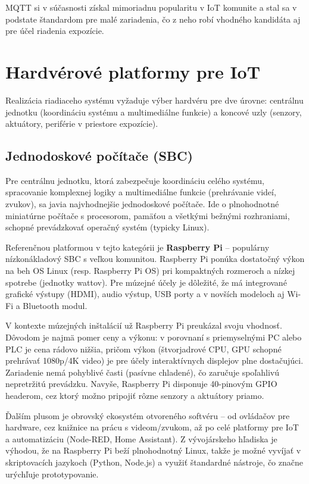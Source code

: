 MQTT si v súčasnosti získal mimoriadnu popularitu v IoT komunite a stal sa v podstate štandardom pre malé zariadenia, čo z neho robí vhodného kandidáta aj pre účel riadenia expozície.

\section{Hardvérové platformy pre IoT}
\label{hardverove-platformy}

Realizácia riadiaceho systému vyžaduje výber hardvéru pre dve úrovne: centrálnu jednotku (koordináciu systému a multimediálne funkcie) a koncové uzly (senzory, aktuátory, periférie v priestore expozície).

\subsection{Jednodoskové počítače (SBC)}
\label{sbc-platformy}

Pre centrálnu jednotku, ktorá zabezpečuje koordináciu celého systému, spracovanie komplexnej logiky a multimediálne funkcie (prehrávanie videí, zvukov), sa javia najvhodnejšie jednodoskové počítače. Ide o plnohodnotné miniatúrne počítače s procesorom, pamäťou a všetkými bežnými rozhraniami, schopné prevádzkovať operačný systém (typicky Linux).

Referenčnou platformou v tejto kategórii je \textbf{Raspberry Pi} -- populárny nízkonákladový SBC s veľkou komunitou. Raspberry Pi ponúka dostatočný výkon na beh OS Linux (resp. Raspberry Pi OS) pri kompaktných rozmeroch a nízkej spotrebe (jednotky wattov). Pre múzejné účely je dôležité, že má integrované grafické výstupy (HDMI), audio výstup, USB porty a v novších modeloch aj Wi-Fi a Bluetooth modul.

V kontexte múzejných inštalácií už Raspberry Pi preukázal svoju vhodnosť. Dôvodom je najmä pomer ceny a výkonu: v porovnaní s priemyselnými PC alebo PLC je cena rádovo nižšia, pričom výkon (štvorjadrové CPU, GPU schopné prehrávať 1080p/4K video) je pre účely interaktívnych displejov plne dostačujúci. Zariadenie nemá pohyblivé časti (pasívne chladené), čo zaručuje spoľahlivú nepretržitú prevádzku. Navyše, Raspberry Pi disponuje 40-pinovým GPIO headerom, cez ktorý možno pripojiť rôzne senzory a aktuátory priamo.

Ďalším plusom je obrovský ekosystém otvoreného softvéru -- od ovládačov pre hardware, cez knižnice na prácu s videom/zvukom, až po celé platformy pre IoT a automatizáciu (Node-RED, Home Assistant). Z vývojárskeho hľadiska je výhodou, že na Raspberry Pi beží plnohodnotný Linux, takže je možné vyvíjať v skriptovacích jazykoch (Python, Node.js) a využiť štandardné nástroje, čo značne urýchľuje prototypovanie.

